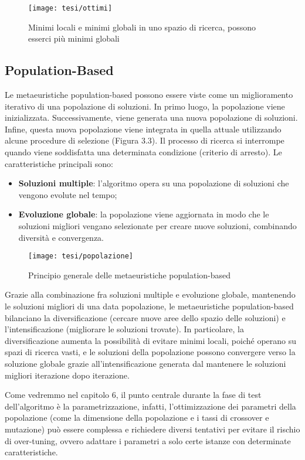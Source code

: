 \begin{figure}[!ht] 
    \centering 
    \texttt{[image: tesi/ottimi]} 
    \caption{Minimi locali e minimi globali in uno spazio di ricerca, possono esserci più minimi globali}
\end{figure}

\subsection{Population-Based}

Le metaeuristiche population-based possono essere viste come un miglioramento iterativo di una popolazione di soluzioni. In primo luogo, la popolazione viene inizializzata. Successivamente, viene generata una nuova popolazione di soluzioni. Infine, questa nuova popolazione viene integrata in quella attuale utilizzando alcune procedure di selezione (Figura 3.3). Il processo di ricerca si interrompe quando viene soddisfatta una determinata condizione (criterio di arresto). %
Le caratteristiche principali sono:
\begin{itemize}
    \item \textbf{Soluzioni multiple}: l'algoritmo opera su una popolazione di soluzioni che vengono evolute nel tempo;
    \item \textbf{Evoluzione globale}: la popolazione viene aggiornata in modo che le soluzioni migliori vengano selezionate per creare nuove soluzioni, combinando diversità e convergenza.
\end{itemize}

\begin{figure}[!ht] 
    \centering 
    \texttt{[image: tesi/popolazione]} 
    \caption{Principio generale delle metaeuristiche population-based}
\end{figure}

Grazie alla combinazione fra soluzioni multiple e evoluzione globale, mantenendo le soluzioni migliori di una data popolazione, le metaeuristiche population-based bilanciano la diversificazione (cercare nuove aree dello spazio delle soluzioni) e l'intensificazione (migliorare le soluzioni trovate). In particolare, la diversificazione aumenta la possibilità di evitare minimi locali, poiché operano su spazi di ricerca vasti, e le soluzioni della popolazione possono convergere verso la soluzione globale grazie all'intensificazione generata dal mantenere le soluzioni migliori iterazione dopo iterazione.

Come vedremmo nel capitolo 6, il punto centrale durante la fase di test dell'algoritmo è la parametrizzazione, infatti, l'ottimizzazione dei parametri della popolazione (come la dimensione della popolazione e i tassi di crossover e mutazione) può essere complessa e richiedere diversi tentativi per evitare il rischio di over-tuning, ovvero adattare i parametri a solo certe istanze con determinate caratteristiche.

